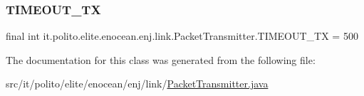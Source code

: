 \subsubsection{\texorpdfstring{T\+I\+M\+E\+O\+U\+T\+\_\+\+TX}{TIMEOUT\_TX}}
{\footnotesize\ttfamily final int it.\+polito.\+elite.\+enocean.\+enj.\+link.\+Packet\+Transmitter.\+T\+I\+M\+E\+O\+U\+T\+\_\+\+TX = 500\hspace{0.3cm}{\ttfamily [static]}}



The documentation for this class was generated from the following file\+:\begin{DoxyCompactItemize}
\item 
src/it/polito/elite/enocean/enj/link/\hyperlink{_packet_transmitter_8java}{Packet\+Transmitter.\+java}\end{DoxyCompactItemize}
